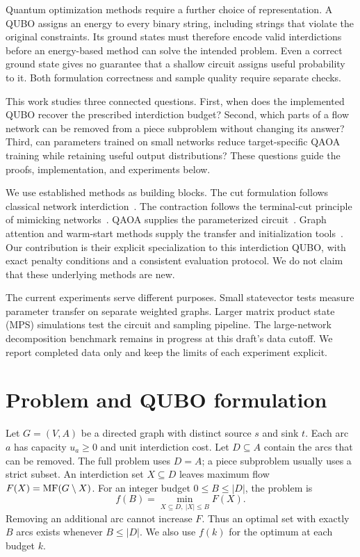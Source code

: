 \documentclass[review,onefignum,onetabnum]{siamart171218}
\begin{document}
Quantum optimization methods require a further choice of representation.
A QUBO assigns an energy to every binary string, including strings that violate the original constraints.
Its ground states must therefore encode valid interdictions before an energy-based method can solve the intended problem.
Even a correct ground state gives no guarantee that a shallow circuit assigns useful probability to it.
Both formulation correctness and sample quality require separate checks.

This work studies three connected questions.
First, when does the implemented QUBO recover the prescribed interdiction budget?
Second, which parts of a flow network can be removed from a piece subproblem without changing its answer?
Third, can parameters trained on small networks reduce target-specific QAOA training while retaining useful output distributions?
These questions guide the proofs, implementation, and experiments below.

We use established methods as building blocks.
The cut formulation follows classical network interdiction~\cite{wood1993}.
The contraction follows the terminal-cut principle of mimicking networks~\cite{hagerup1998}.
QAOA supplies the parameterized circuit~\cite{farhi2014}.
Graph attention and warm-start methods supply the transfer and initialization tools~\cite{brody2022,egger2021,he2026}.
Our contribution is their explicit specialization to this interdiction QUBO, with exact penalty conditions and a consistent evaluation protocol.
We do not claim that these underlying methods are new.

The current experiments serve different purposes.
Small statevector tests measure parameter transfer on separate weighted graphs.
Larger matrix product state (MPS) simulations test the circuit and sampling pipeline.
The large-network decomposition benchmark remains in progress at this draft's data cutoff.
We report completed data only and keep the limits of each experiment explicit.

\section{Problem and QUBO formulation}\label{sec:formulation}
Let $G=(V,A)$ be a directed graph with distinct source $s$ and sink $t$.
Each arc $a$ has capacity $u_a\geq 0$ and unit interdiction cost.
Let $D\subseteq A$ contain the arcs that can be removed.
The full problem uses $D=A$; a piece subproblem usually uses a strict subset.
An interdiction set $X\subseteq D$ leaves maximum flow $F(X)=\operatorname{MF}(G\setminus X)$.
For an integer budget $0\leq B\leq |D|$, the problem is
\begin{equation}\label{eq:nip}
 f(B)=\min_{X\subseteq D,\ |X|\leq B} F(X).
\end{equation}
Removing an additional arc cannot increase $F$.
Thus an optimal set with exactly $B$ arcs exists whenever $B\leq |D|$.
We also use $f(k)$ for the optimum at each budget $k$.
\end{document}
